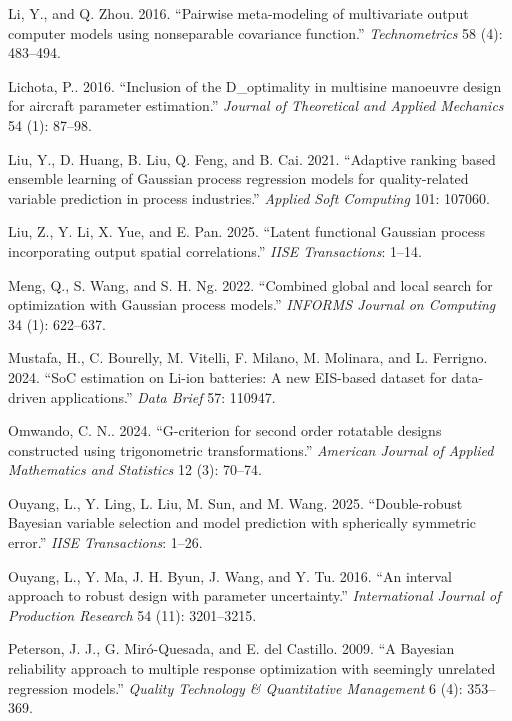 \documentclass[]{interact}
\theoremstyle{plain}%
\theoremstyle{definition}
\theoremstyle{remark}
\begin{document}
\begin{thebibliography}{}
Li, Y., and Q. Zhou. 2016. ``Pairwise meta-modeling of multivariate output computer models using nonseparable covariance function.'' \emph{Technometrics} 58 (4): 483--494.

Lichota, P.. 2016. ``Inclusion of the D\_optimality in multisine manoeuvre design for aircraft parameter estimation.'' \emph{Journal of Theoretical and Applied Mechanics} 54 (1): 87--98.

Liu, Y., D. Huang, B. Liu, Q. Feng, and B. Cai. 2021. ``Adaptive ranking based ensemble learning of Gaussian process regression models for quality-related variable prediction in process industries.'' \emph{Applied Soft Computing} 101: 107060.

Liu, Z., Y. Li, X. Yue, and E. Pan. 2025. ``Latent functional Gaussian process incorporating output spatial correlations.'' \emph{IISE Transactions}: 1--14.

Meng, Q., S. Wang, and S. H. Ng. 2022. ``Combined global and local search for optimization with Gaussian process models.'' \emph{INFORMS Journal on Computing} 34 (1): 622--637.

Mustafa, H., C. Bourelly, M. Vitelli, F. Milano, M. Molinara, and L. Ferrigno. 2024. ``SoC estimation on Li-ion batteries: A new EIS-based dataset for data-driven applications.'' \emph{Data Brief} 57: 110947.

Omwando, C. N.. 2024. ``G-criterion for second order rotatable designs constructed using trigonometric transformations.'' \emph{American Journal of Applied Mathematics and Statistics} 12 (3): 70--74.

Ouyang, L., Y. Ling, L. Liu, M. Sun, and M. Wang. 2025. ``Double-robust Bayesian variable selection and model prediction with spherically symmetric error.'' \emph{IISE Transactions}: 1--26.

Ouyang, L., Y. Ma, J. H. Byun, J. Wang, and Y. Tu. 2016. ``An interval approach to robust design with parameter uncertainty.'' \emph{International Journal of Production Research} 54 (11): 3201--3215.

Peterson, J. J., G. Mir{\'o}-Quesada, and E. del Castillo. 2009. ``A Bayesian reliability approach to multiple response optimization with seemingly unrelated regression models.'' \emph{Quality Technology \& Quantitative Management} 6 (4): 353--369.



\end{thebibliography}
\end{document}
